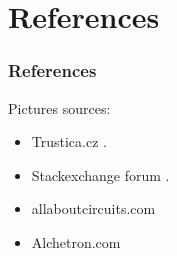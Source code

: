 \section{References}
\begin{frame}[t]
    \frametitle{References}
Pictures sources:
\begin{itemize}
    \item Trustica.cz \cite{noauthor_trustica_nodate}.
    \item Stackexchange forum \cite{viggers_elliptic_2019}.
    \item allaboutcircuits.com \cite{noauthor_dr_nodate}
    \item Alchetron.com \cite{university_victor_2017}
\end{itemize}
\end{frame}

